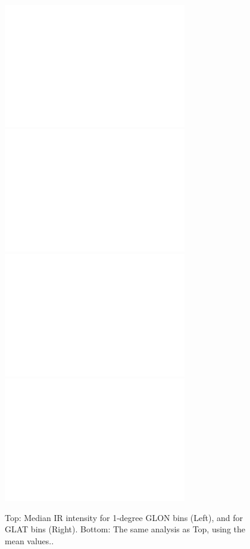 \documentclass[preprint2,longabstract]{aastex}
\begin{document}
      \begin{figure}
        \label{fig:IRvbyGLOTandGLON}
        \includegraphics[width=80mm]{../Plots/IntensityByGLON_median.pdf}
        \includegraphics[width=80mm]{../Plots/IntensityByGLAT_median.pdf}
        \includegraphics[width=80mm]{../Plots/IntensitybyGLON_mean.pdf}
        \includegraphics[width=80mm]{../Plots/IntensityByGLAT_mean.pdf}
        \centering
        \caption{Top: Median IR intensity  for 1-degree GLON bins (Left), and for GLAT bins (Right). Bottom: The same analysis as Top, using the mean values..}
      \end{figure}
\end{document}
